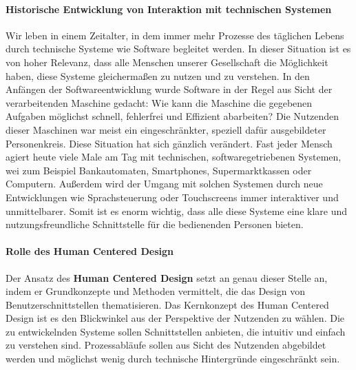 \paragraph{Historische Entwicklung von Interaktion mit technischen Systemen}
Wir leben in einem Zeitalter, in dem immer mehr Prozesse des täglichen Lebens
durch technische Systeme wie Software begleitet werden. In dieser Situation ist
es von hoher Relevanz, dass alle Menschen unserer Gesellschaft die Möglichkeit
haben, diese Systeme gleichermaßen zu nutzen und zu verstehen. In den Anfängen
der Softwareentwicklung wurde Software in der Regel aus Sicht der
verarbeitenden Maschine gedacht: Wie kann die Maschine die gegebenen Aufgaben
möglichst schnell, fehlerfrei und Effizient abarbeiten? Die Nutzenden dieser
Maschinen war meist ein eingeschränkter, speziell dafür ausgebildeter
Personenkreis. Diese Situation hat sich gänzlich verändert. Fast jeder Mensch
agiert heute viele Male am Tag mit technischen, softwaregetriebenen Systemen,
wei zum Beispiel Bankautomaten, Smartphones, Supermarktkassen oder Computern.
Außerdem wird der Umgang mit solchen Systemen durch neue Entwicklungen wie
Sprachsteuerung oder Touchscreens immer interaktiver und unmittelbarer. Somit
ist es enorm wichtig, dass alle diese Systeme eine klare und
nutzungsfreundliche Schnittstelle für die bedienenden Personen bieten.

\paragraph{Rolle des Human Centered Design}
Der Ansatz des \textbf{Human Centered Design} setzt an genau dieser Stelle an,
indem er Grundkonzepte und Methoden vermittelt, die das Design von
Benutzerschnittstellen thematisieren. Das Kernkonzept des Human Centered Design
ist es den Blickwinkel aus der Perspektive der Nutzenden zu wählen. Die zu
entwickelnden Systeme sollen Schnittstellen anbieten, die intuitiv und einfach
zu verstehen sind. Prozessabläufe sollen aus Sicht des Nutzenden abgebildet
werden und möglichst wenig durch technische Hintergründe eingeschränkt sein.


